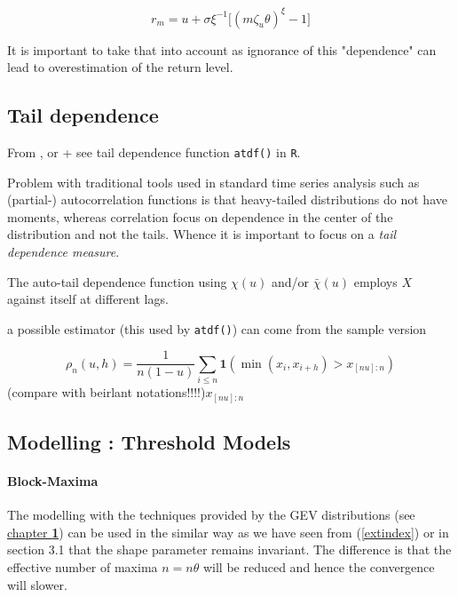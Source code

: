 \documentclass[11pt,a4paper,openany ]{book}
\begin{document}
\begin{equation}
r_m = u + \sigma\xi^{-1}\Big[(m\zeta_u\theta)^{\xi}-1\Big]
\end{equation}

It is important to take that into account as ignorance of this "dependence" can lead to overestimation of the return level.

\subsection{Tail dependence}
From \cite[section 2.6]{reiss_statistical_2007}, \cite[section 8.4]{coles_introduction_2001} or \cite[section 9.4.1,10.3.4]{beirlant_practical_1996} + see tail dependence function \texttt{atdf()} in \texttt{R}.

Problem with traditional tools used in standard time series analysis such as (partial-) autocorrelation functions is that heavy-tailed distributions do not have moments, whereas correlation focus on dependence in the center of the distribution and not the tails. \citet[pp.134]{wada_extreme_2016} Whence it is important to focus on a \textit{tail dependence measure}.

The auto-tail dependence function using $\chi(u)$ and/or $\bar{\chi}(u)$ employs $X$ against itself at different lags.


a possible estimator (this used by \texttt{atdf()}) can come from the sample version 

\begin{equation}\label{autotailsample}
\rho_n(u,h)=\frac{1}{n(1-u)}\sum_{i\leq n}\mathbf{ 1}(\min (x_i,x_{i+h})>x_{[nu]:n})
\end{equation}
(compare with beirlant notations!!!!)$x_{[nu]:n}$


\subsection{Modelling : Threshold Models}

\paragraph*{Block-Maxima}
The modelling with the techniques provided by the GEV distributions (see 
\hyperref[sec::1]{chapter \textbf{1}}) can be used in 
the similar way as we have seen from (\ref{extindex}) or in section 3.1 that the shape 
parameter remains invariant. The difference is that the effective number of maxima 
$n=n\theta$ 
will be reduced and hence the convergence will slower. 
\end{document}

